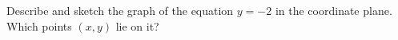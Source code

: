 Describe and sketch the graph of the equation $y=-2$ in the coordinate plane. Which points $(x,y)$ lie on it?
